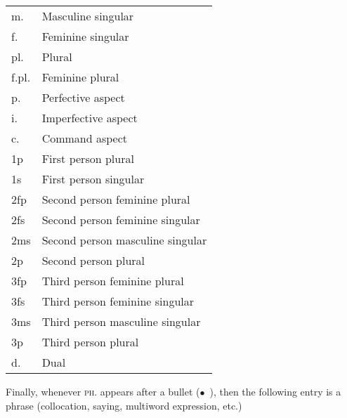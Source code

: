 \documentclass[11pt]{book}
\begin{document}
\begin{table}[h]
  \begin{tabular}{ll}
  m.    & Masculine singular               \\
  f.    & Feminine singular                \\
  pl.   & Plural                           \\
  f.pl. & Feminine plural                  \\
  p.    & Perfective aspect                \\
  i.    & Imperfective aspect              \\
  c.    & Command aspect                   \\
  1p    & First person plural              \\
  1s    & First person singular            \\
  2fp   & Second person feminine plural    \\
  2fs   & Second person feminine singular  \\
  2ms   & Second person masculine singular \\
  2p    & Second person plural             \\
  3fp   & Third person feminine plural     \\
  3fs   & Third person feminine singular   \\
  3ms   & Third person masculine singular  \\
  3p    & Third person plural              \\
  d.    & Dual                             \\
  \end{tabular}
\end{table}

\vspace{5mm}
Finally, whenever \textsc{ph.} appears after a bullet ($\bullet$\ ), then the following entry is a phrase (collocation, saying, multiword expression, etc.)




% 
% 
% 
% 
% 
% 
% 
% 
% 
% 
% 
% 
% 
% 
% 
% 
% 
% 
% 
% 
% 
% 
% 
% 
% 
% 
% 

\printindex
\printbibliography
\end{document}
